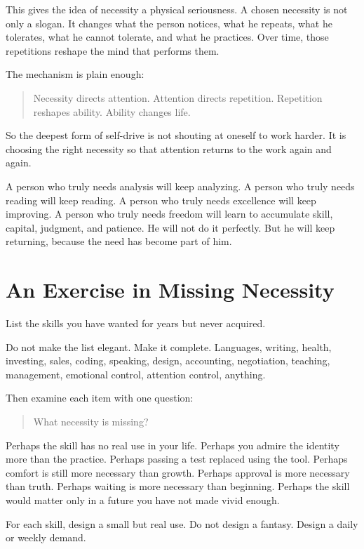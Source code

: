 This gives the idea of necessity a physical seriousness. A chosen necessity is not only a slogan. It changes what the person notices, what he repeats, what he tolerates, what he cannot tolerate, and what he practices. Over time, those repetitions reshape the mind that performs them.

The mechanism is plain enough:

\begin{quote}
Necessity directs attention. Attention directs repetition. Repetition reshapes ability. Ability changes life.
\end{quote}

So the deepest form of self-drive is not shouting at oneself to work harder. It is choosing the right necessity so that attention returns to the work again and again.

A person who truly needs analysis will keep analyzing. A person who truly needs reading will keep reading. A person who truly needs excellence will keep improving. A person who truly needs freedom will learn to accumulate skill, capital, judgment, and patience. He will not do it perfectly. But he will keep returning, because the need has become part of him.

\section*{An Exercise in Missing Necessity}

List the skills you have wanted for years but never acquired.

Do not make the list elegant. Make it complete. Languages, writing, health, investing, sales, coding, speaking, design, accounting, negotiation, teaching, management, emotional control, attention control, anything.

Then examine each item with one question:

\begin{quote}
What necessity is missing?
\end{quote}

Perhaps the skill has no real use in your life. Perhaps you admire the identity more than the practice. Perhaps passing a test replaced using the tool. Perhaps comfort is still more necessary than growth. Perhaps approval is more necessary than truth. Perhaps waiting is more necessary than beginning. Perhaps the skill would matter only in a future you have not made vivid enough.

For each skill, design a small but real use. Do not design a fantasy. Design a daily or weekly demand.

